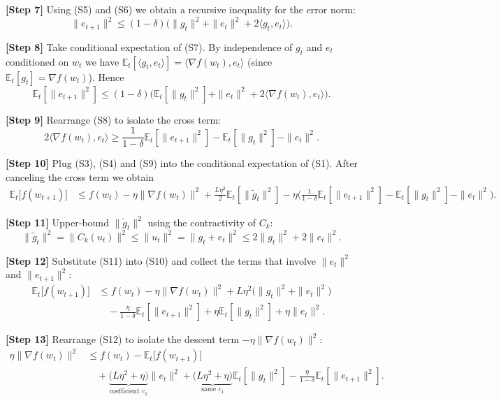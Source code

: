 \documentclass{article}
\begin{document}
\noindent\textbf{[Step 7]} Using (S5) and (S6) we obtain a recursive inequality for the error norm:
\[
\|e_{t+1}\|^{2}\le (1-\delta)\big(\|g_t\|^{2}+\|e_t\|^{2}+2\langle g_t,e_t\rangle\big). \tag{S7}
\]

\noindent\textbf{[Step 8]} Take conditional expectation of (S7). By independence of $g_t$ and $e_t$ conditioned on $w_t$ we have $\mathbb{E}_t[\langle g_t,e_t\rangle]=\langle\nabla f(w_t),e_t\rangle$ (since $\mathbb{E}_t[g_t]=\nabla f(w_t)$). Hence
\[
\mathbb{E}_t[\|e_{t+1}\|^{2}]
\le (1-\delta)\big(\mathbb{E}_t[\|g_t\|^{2}]+\|e_t\|^{2}+2\langle\nabla f(w_t),e_t\rangle\big). \tag{S8}
\]

\noindent\textbf{[Step 9]} Rearrange (S8) to isolate the cross term:
\[
2\langle\nabla f(w_t),e_t\rangle
\ge \frac{1}{1-\delta}\mathbb{E}_t[\|e_{t+1}\|^{2}]
      -\mathbb{E}_t[\|g_t\|^{2}]-\|e_t\|^{2}. \tag{S9}
\]

\noindent\textbf{[Step 10]} Plug (S3), (S4) and (S9) into the conditional expectation of (S1). After canceling the cross term we obtain
\[
\begin{aligned}
\mathbb{E}_t\!\big[f(w_{t+1})\big]
&\le f(w_t)-\eta\|\nabla f(w_t)\|^{2}
   +\frac{L\eta^{2}}{2}\mathbb{E}_t[\|\tilde g_t\|^{2}]
   -\eta\Big(\frac{1}{1-\delta}\mathbb{E}_t[\|e_{t+1}\|^{2}]
          -\mathbb{E}_t[\|g_t\|^{2}]
          -\|e_t\|^{2}\Big). 
\end{aligned}
\tag{S10}
\]

\noindent\textbf{[Step 11]} Upper‑bound $\|\tilde g_t\|^{2}$ using the contractivity of $C_k$:
\[
\|\tilde g_t\|^{2}= \|C_k(u_t)\|^{2}
\le \|u_t\|^{2}
= \|g_t+e_t\|^{2}
\le 2\|g_t\|^{2}+2\|e_t\|^{2}. \tag{S11}
\]

\noindent\textbf{[Step 12]} Substitute (S11) into (S10) and collect the terms that involve $\|e_t\|^{2}$ and $\|e_{t+1}\|^{2}$:
\[
\begin{aligned}
\mathbb{E}_t\!\big[f(w_{t+1})\big]
&\le f(w_t)-\eta\|\nabla f(w_t)\|^{2}
   +L\eta^{2}\big(\|g_t\|^{2}+\|e_t\|^{2}\big)    \\
&\quad -\frac{\eta}{1-\delta}\mathbb{E}_t[\|e_{t+1}\|^{2}]
   +\eta\mathbb{E}_t[\|g_t\|^{2}]
   +\eta\|e_t\|^{2}.
\end{aligned}
\tag{S12}
\]

\noindent\textbf{[Step 13]} Rearrange (S12) to isolate the descent term $-\eta\|\nabla f(w_t)\|^{2}$:
\[
\begin{aligned}
\eta\|\nabla f(w_t)\|^{2}
&\le f(w_t)-\mathbb{E}_t\!\big[f(w_{t+1})\big] \\
&\quad +\underbrace{\Big(L\eta^{2}+\eta\Big)}_{\text{coefficient }c_1}\|e_t\|^{2}
   +\underbrace{\Big(L\eta^{2}+\eta\Big)}_{\text{same }c_1}\mathbb{E}_t[\|g_t\|^{2}]
   -\frac{\eta}{1-\delta}\mathbb{E}_t[\|e_{t+1}\|^{2}].
\end{aligned}
\tag{S13}
\]
\end{document}

